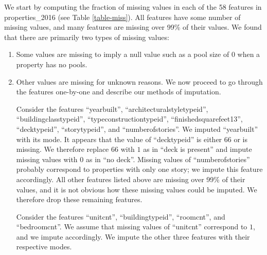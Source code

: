 \documentclass[12pt]{article}
\begin{document}
We start by computing the fraction of missing values in each of the 58 features in properties_2016 (see Table \ref{table-miss}). All features have some number of missing values, and many features are missing over 99\% of their values. We found that there are primarily two types of missing values:
\begin{enumerate}
\item Some values are missing to imply a null value such as a pool size of $0$ when a property has no pools.
\item Other values are missing for unknown reasons.
We now proceed to go through the features one-by-one and describe our methods of imputation.

Consider the features ``yearbuilt'', ``architecturalstyletypeid'', ``buildingclasstypeid'', ``typeconstructiontypeid'', ``finishedsquarefeet13'', ``decktypeid'', ``storytypeid'', and ``numberofstories''. We imputed ``yearbuilt'' with its mode. It appears that the value of ``decktypeid'' is either 66 or is missing. We therefore replace 66 with $1$ as in ``deck is present'' and impute missing values with $0$ as in ``no deck''. Missing values of ``numberofstories'' probably correspond to properties with only one story; we impute this feature accordingly. All other features listed above are missing over 99\% of their values, and it is not obvious how these missing values could be imputed. We therefore drop these remaining features.

Consider the features ``unitcnt'', ``buildingtypeid'', ``roomcnt'', and ``bedroomcnt''. We assume that missing values of ``unitcnt'' correspond to $1$, and we impute accordingly. We impute the other three features with their respective modes.


\end{enumerate}
\end{document}
